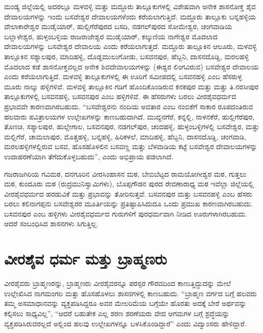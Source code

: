 ಮಂಡ್ಯ ಜಿಲ್ಲೆಯಲ್ಲಿ ಅದರಲ್ಲೂ ಮಳವಳ್ಳಿ ಮತ್ತು ಮದ್ದೂರು ತಾಲ್ಲೂಕುಗಳಲ್ಲಿ ವಿಶೇಷವಾಗಿ ಅನೇಕ ಶಾಸನೋಕ್ತ ಶೈವ ದೇವಾಲಯಗಳನ್ನು ಇಂದು ಬಸವೇಶ್ವರ ದೇವಾಲಯಗಳೆಂದು ಕರೆಯಲಾಗುತ್ತಿದೆ. ಮದ್ದೂರು ತಾಲ್ಲೂಕು ಬನ್ನಹಳ್ಳಿಯ ವೇಲಾಕಾರೇಶ್ವರ ಮುಡೈಯಾರ್​, ಹುಲ್ಲಿಗೆರೆಪುರದ ಬಸದಿ, ನಡಗಲ್​ಪುರದ ಸೋಮೇಶ್ವರ, ಚಂಗವಾಡಿಯ ಬಲ್ಲಾಳೇಶ್ವರ, ಹುಳ್ಳಂಬಳ್ಳಿಯ ರಾಜರಾಜೇಶ್ವರ ಮುಡೈಯಾರ್​, ಕಲ್ಕುಣಿಯ ನಾಗೇಶ್ವರ ಮೊದಲಾದ ದೇವಾಲಯಗಳನ್ನು ಬಸವೇಶ್ವರ ದೇವಾಲಯ ಎಂದು ಕರೆಯಲಾಗುತ್ತದೆ. ಮದ್ದೂರು ತಾಲ್ಲೂಕಿನ ಆಲೂರು, ಮಳವಳ್ಳಿ ತಾಲ್ಲೂಕಿನ ಸಶ್ಯಾಲಪುರ, ಮಾದಿಹಳ್ಳಿ, ದೊಡ್ಡಮುಲುಗೋಡು, ಬಸವನಪುರ, ಹೆಬ್ಬನಿ, ದಾಸನದೊಡ್ಡಿ, ಮರಲಹಳ್ಳಿ ಮೊದಲಾದ ಕಡೆ ಶಾಸನೋಕ್ತವಲ್ಲದ ಅನೇಕ ಶಿವದೇವಾಲಯಗಳನ್ನು (ಈಶ್ವರ ಲಿಂಗವಿರುವ) ಬಸವೇಶ್ವರ ದೇವಾಲಯ ಎಂದು ಕರೆಯಲಾಗುತ್ತಿದೆ. ಮಳವಳ್ಳಿ ತಾಲ್ಲೂಕುಗಳಲ್ಲಿ ಈ ಊರಿಗೆ ಸಮೀಪದಲ್ಲಿ ಬಸವನಹಳ್ಳಿ ಎಂಬ ಹೆಸರುಳ್ಳ ಮೂರು ನಾಲ್ಕು ಹಳ್ಳಿಗಳಿವೆ. ಮಳವಳ್ಳಿ ತಾಲ್ಲೂಕಿನ ಗಡಿಗೆ ಹೊಂದಿಕೊಂಡಿರುವ ಕನಕಪುರ ಮತ್ತು ಮತ್ತು ತಿ.ನರಸೀಪುರ ತಾಲ್ಲೂಕುಗಳಲ್ಲಿ ಬಸವನಹಳ್ಳಿ, ಬಸವನಪುರ ಎಂಬ ಹಳ್ಳಿಗಳಿವೆ. ಈ ಹೆಸರುಗಳು ಬರಲು ವೀರಶೈವಧರ್ಮದ ಪ್ರಭಾವವೇ ಕಾರಣವಾಗಿರಬಹುದು. “ಬಸವೇಶ್ವರನು ನಂದಿಯ ಅವತಾರ ಎಂಬ ನಂಬಿಕೆಗೆ ಸಾಕಾರ ರೂಪದಂತಿರುವ ಹಲವಾರು ಪವಿತ್ರಾಲಯಗಳ ಉಲ್ಲೇಖಗಳನ್ನು ಕಾಣಬಹು\-ದಾಗಿದೆ. ಮುದ್ದನಗೆರೆ, ಕನ್ನಲ್ಲಿ, ನಾಳನಕೆರೆ, ಹುಲ್ಲಿಗೆರೆಪುರ, ತೊಣಚಿ, ಸಶ್ಯಾಲಪುರ, ಹುಲ್ಲೇಗಾಲ, ಬಸವನಪುರ, ನಡಗಲ್​ಪುರ, ಚಂದಹಳ್ಳಿ, ಹುಳ್ಳಂಬಳ್ಳಿಗಳಲ್ಲಿ ಬಸವೇಶ್ವರ, ಮತ್ತು ಮಲ್ಲಿಗೆರೆ, ಚಾಮಲಾಪುರ, ಮೊತ್ತಹಳ್ಳಿ, ಬನ್ನಹಳ್ಳಿ, ಹಿರಿಕಳಲೆ, ಮಾದಿಹಳ್ಳಿ, ಹೆಬ್ಬನಿ, ದಾಸನದೊಡ್ಡಿ, ಚಂಗವಾಡಿ, ಮರಲಹಳ್ಳಿಗಳಲ್ಲಿರುವ ಬಸವ, ಹೊಸಹೊಳಲಿನ ಬಸವಣ್ಣ ಮತ್ತು ಬೆಳವಾಡಿಯ ಕಟ್ಟೆ ಬಸವೇಶ್ವರ ದೇವಾಲಯಗಳನ್ನು ಉದಾಹರಣೆಯಾಗಿ ತೆಗೆದುಕೊಳ್ಳಬಹುದು”,  ಎಂದು ಅಭಿಪ್ರಾಯ ಪಡಲಾಗಿದೆ.

ಗಜರಾಜಗಿರಿಯ ಗವಿಮಠ, ದನಗೂರಿನ ವೀರಸಿಂಹಾಸನ ಮಠ, ಬೇಬಿಬೆಟ್ಟದ ರಾಮಯೋಗೀಶ್ವರ ಮಠ, ಗುತ್ತಲು ಮಠ, ಕುಂದೂರು ಮಠ (ರುದ್ರಮುನಿಸ್ವಾಮಿಗಳು), ಬೊಪ್ಪಗೌಡನ ಪುರದ ರೇವಣಾರಾಧ್ಯ ಮಠ ಇವೆಲ್ಲಾ ಜಿಲ್ಲೆಯಲ್ಲಿ ವೀರಶೈವಧರ್ಮದ ಹರಡುವಿಕೆ ಮತ್ತು ಪ್ರಭಾವನ್ನು ತೋರಿಸುತ್ತವೆ. ಬಸವನಪುರ ಮತ್ತು ಬಸವನಹಳ್ಳಿ ಎಂಬ ಹೆಸರು ಬರಲು ಕಲಿನಾಗಪ್ಪನು ಬಸವೇಶ್ವರರ ಮೂರ್ತಿಯನ್ನು ಪ್ರತಿಷ್ಟಾಪಿಸಿದುದೂ ಒಂದು ಪ್ರಮುಖ ಕಾರಣವಾಗಿರಬಹುದು. ಬಸವನಪುರ ಎಂಬ ಹಳ್ಳಿಗಳು ವೀರಶೈವಧರ್ಮದ ಗುರುಗಳಿಗೆ ಪುರಧರ್ಮವಾಗಿ ನೀಡಿದ ಊರುಗಳಾಗಿರಬಹುದು. ಆದರೆ ಸಂಬಂಧಿಸಿದ ಶಾಸನಗಳು ಸಿಗುತ್ತಿಲ್ಲ.

\section*{ವೀರಶೈವ ಧರ್ಮ ಮತ್ತು ಬ್ರಾಹ್ಮಣರು}

ವೀರಶೈವರು ಬ್ರಾಹ್ಮಣರನ್ನು, ಬ್ರಾಹ್ಮಣರು ವೀರಶೈವರನ್ನೂ ಪರಸ್ಪರ ಗೌರವದಿಂದ ಕಾಣುತ್ತಿದ್ದುದನ್ನು ಮೇಲೆ ಉಲ್ಲೇಖಿಸಿದ ನಾಗಮಂಗಲ ಮತ್ತು ಹೊಸಹೊಳಲು ಶಾಸನಗಳಲ್ಲಿ ಕಾಣಬಹುದು. “ಬ್ರಾಹ್ಮಣ ವರ್ಗದ ಬಗ್ಗೆ ಹಲವರು ತಮ್ಮ ಅಸಮಾಧಾನ\-ವನ್ನು ವ್ಯಕ್ತಪಡಿಸಿದ್ದರೂ ಅವರ ಮೇಲರಿಮೆಯ ಬಗ್ಗೆಯೇ ಹೊರತು ಅದಕ್ಕೆ ಬೇರೆ ಅರ್ಥವನ್ನು ಕಲ್ಪಿಸಲು ಸಾಧ್ಯವಿಲ್ಲ”, “ಆದರೆ ಬಹುತೇಕ ಎಲ್ಲ ಶರಣ ಶರಣೆಯರು ವೇದ ಆಗಮಗಳ ಬಗ್ಗೆ ಶ್ರದ್ಧೆಯನ್ನು ವ್ಯಕ್ತಪಡಿಸಿರುವರಲ್ಲದೆ ಅಲ್ಲಿಂದ ಹಲವು ಉಲ್ಲೇಖಗಳನ್ನೂ ಬಳಸಿಕೊಂಡಿದ್ದಾರೆ” ಎಂದು ವಿದ್ವಾಂಸರು ಹೇಳಿದ್ದಾರೆ.


